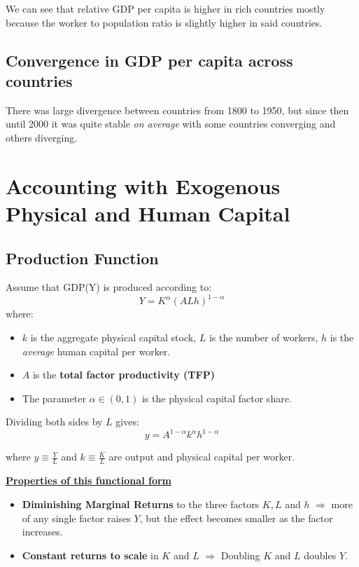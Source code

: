 \documentclass[11pt]{article}
\begin{document}
We can see that relative GDP per capita is higher in rich countries mostly because the worker to population ratio is slightly higher in said countries.

\subsection{Convergence in GDP per capita across countries}

There was large divergence between countries from 1800 to 1950, but since then until 2000 it was quite stable \textit{on average} with some countries converging and others diverging.

\section{Accounting with Exogenous Physical and Human Capital}

\subsection{Production Function}

\begin{shaded}
    Assume that GDP(Y) is produced according to:
    \[Y=K^\alpha(ALh)^{1-\alpha}\]
    where:
    \begin{itemize}
        \item $k$ is the aggregate physical capital stock, $L$ is the number of workers, $h$ is the \textit{average} human capital per worker.
        \item $A$ is the \textbf{total factor productivity (TFP)}
        \item The parameter $\alpha \in (0,1)$ is the physical capital factor share.
    \end{itemize}
\end{shaded}

Dividing both sides by $L$ gives:
\begin{equation}
\label{gdppc}
    y = A^{1-\alpha} k^\alpha h^{1-\alpha}
\end{equation}

where $y \equiv \frac{Y}{L}$ and $k \equiv \frac{K}{L}$ are output and physical capital per worker.

\begin{shaded}
\textbf{\underline{Properties of this functional form}}
    \begin{itemize}
    \item \textbf{Diminishing Marginal Returns} to the three factors $K, L$ and $h$ $\Rightarrow$ more of any single factor raises $Y$, but the effect becomes smaller as the factor increases.
    \item \textbf{Constant returns to scale} in $K$ and $L$ $\Rightarrow$ Doubling $K$ and $L$ doubles $Y$.
\end{itemize}
\end{shaded}
\end{document}
